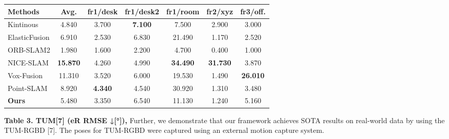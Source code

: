 \documentclass[twocolumn]{article} %
\begin{document}
\begin{table}[htbp]
\centering
\begin{adjustbox}{max width=\columnwidth,max height=!,center}
\begin{tabular}{lcccccc}
\toprule
\textbf{Methods} & \textbf{Avg.} & \textbf{fr1/desk} & \textbf{fr1/desk2} & \textbf{fr1/room} & \textbf{fr2/xyz} & \textbf{fr3/off.}\\
\midrule
Kintinous & 4.840 & \cellcolor{lime!50}3.700 & \cellcolor{green!30}\textbf{7.100} & 7.500 & \cellcolor{yellow!30}2.900 & 3.000\\
ElasticFusion & 6.910 & 2.530 & \cellcolor{yellow!30}6.830 & \cellcolor{lime!50}21.490 & 1.170 & 2.520\\
ORB-SLAM2 & 1.980 & 1.600 & 2.200 & 4.700 & 0.400 & 1.000\\
NICE-SLAM & \cellcolor{green!30}\textbf{15.870} & \cellcolor{yellow!30}4.260 & 4.990 & \cellcolor{green!30}\textbf{34.490} & \cellcolor{green!30}\textbf{31.730} & \cellcolor{lime!50}3.870\\
Vox-Fusion & \cellcolor{yellow!30}11.310 & 3.520 & 6.000 & 19.530 & \cellcolor{lime!50}1.490 & \cellcolor{green!30}\textbf{26.010}\\
Point-SLAM & \cellcolor{lime!50}8.920 & \cellcolor{green!30}\textbf{4.340} & 4.540 & \cellcolor{yellow!30}30.920 & 1.310 & 3.480\\
\midrule
\textbf{Ours} & 5.480 & 3.350 & \cellcolor{lime!50}6.540 & 11.130 & 1.240 & \cellcolor{yellow!30}5.160\\
\bottomrule
\end{tabular}
\end{adjustbox}
\end{table}

\textbf{Table 3. TUM{[}7{]} (eR RMSE ↓{[}°{]}),} Further, we demonstrate
that our framework achieves SOTA results on real-world data by using the
TUM-RGBD {[}7{]}. The poses for TUM-RGBD were captured using an external
motion capture system.
\end{document}
